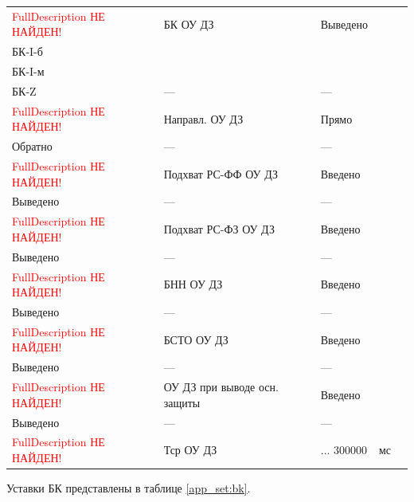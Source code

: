 \begin{longtable}{|>{\centering\arraybackslash}m{5.3cm}|>{\centering\arraybackslash}m{3.3cm}|>{\centering\arraybackslash}m{4.2cm}|>{\centering\arraybackslash}m{1.8cm}|>{\centering\arraybackslash}m{1cm}|}
\hline
\raggedright \textcolor{red}{FullDescription НЕ НАЙДЕН!} & \centering БК ОУ ДЗ & \centering Выведено \\ БК-I-б \\ БК-I-м \\ БК-Z & \centering --- & \centering \arraybackslash --- \\
\hline
\raggedright \textcolor{red}{FullDescription НЕ НАЙДЕН!} & \centering Направл. ОУ ДЗ & \centering Прямо \\ Обратно & \centering --- & \centering \arraybackslash --- \\
\hline
\raggedright \textcolor{red}{FullDescription НЕ НАЙДЕН!} & \centering Подхват РС-ФФ ОУ ДЗ & \centering Введено \\ Выведено & \centering --- & \centering \arraybackslash --- \\
\hline
\raggedright \textcolor{red}{FullDescription НЕ НАЙДЕН!} & \centering Подхват РС-ФЗ ОУ ДЗ & \centering Введено \\ Выведено & \centering --- & \centering \arraybackslash --- \\
\hline
\raggedright \textcolor{red}{FullDescription НЕ НАЙДЕН!} & \centering БНН ОУ ДЗ & \centering Введено \\ Выведено & \centering --- & \centering \arraybackslash --- \\
\hline
\raggedright \textcolor{red}{FullDescription НЕ НАЙДЕН!} & \centering БСТО ОУ ДЗ & \centering Введено \\ Выведено & \centering --- & \centering \arraybackslash --- \\
\hline
\raggedright \textcolor{red}{FullDescription НЕ НАЙДЕН!} & \centering ОУ ДЗ при выводе осн. защиты & \centering Введено \\ Выведено & \centering --- & \centering \arraybackslash --- \\
\hline
\raggedright \textcolor{red}{FullDescription НЕ НАЙДЕН!} & \centering Тср ОУ ДЗ & \centering 0 ... 300000 & \centering мс & \centering \arraybackslash 5 \\
\hline
\end{longtable}
\normalsize



\par
Уставки БК представлены в таблице \ref{app_set:bk}.


